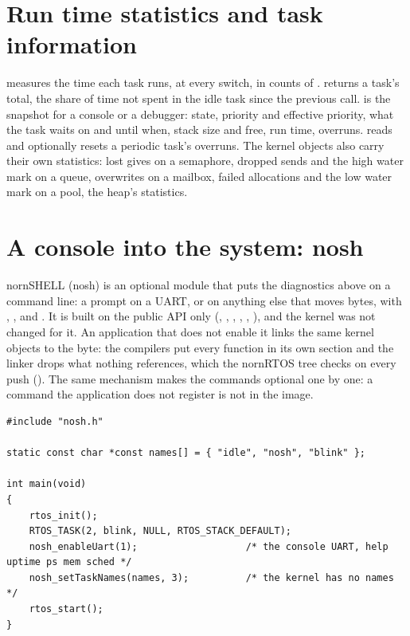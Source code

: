\section{Run time statistics and task information}

 measures the time each task runs, at every switch, in
counts of .  returns a task's total,
 the share of time not spent in the idle task since the previous
call.  is the snapshot for a console or a debugger: state,
priority and effective priority, what the task waits on and until when, stack size and
free, run time, overruns.  reads and optionally resets a
periodic task's overruns. The kernel objects also carry their own statistics: lost gives
on a semaphore, dropped sends and the high water mark on a queue, overwrites on a mailbox,
failed allocations and the low water mark on a pool, the heap's statistics.

\section{A console into the system: nosh}
\label{sec:nosh}

nornSHELL (nosh) is an optional module that puts the diagnostics above on a command
line: a prompt on a UART, or on anything else that moves bytes, with ,
,  and . It is built on the public API only
(, , ,
, , ), and the
kernel was not changed for it. An application that does not enable it links the same
kernel objects to the byte: the compilers put every function in its own section and the
linker drops what nothing references, which the nornRTOS tree checks on every push
(). The same mechanism makes the commands optional one by
one: a command the application does not register is not in the image.

\begin{lstlisting}
#include "nosh.h"

static const char *const names[] = { "idle", "nosh", "blink" };

int main(void)
{
    rtos_init();
    RTOS_TASK(2, blink, NULL, RTOS_STACK_DEFAULT);
    nosh_enableUart(1);                   /* the console UART, help uptime ps mem sched */
    nosh_setTaskNames(names, 3);          /* the kernel has no names */
    rtos_start();
}
\end{lstlisting}

